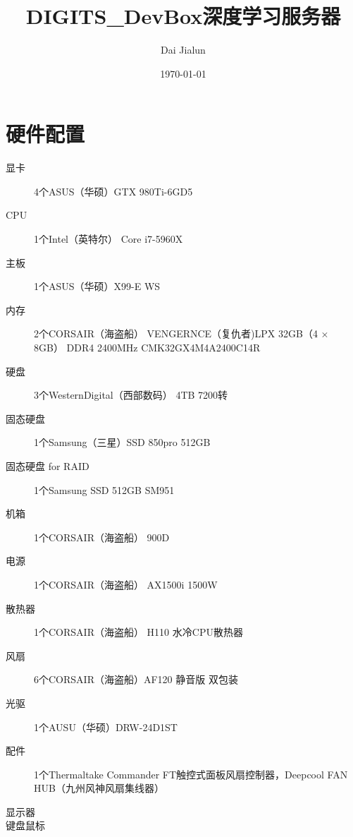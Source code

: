 

\title{\vspace{-2em} DIGITS\_DevBox深度学习服务器\\
\normalsize{}}
\author{Dai Jialun}
\date{\vspace{-0.7em} \today \vspace{-0.7em}}
\maketitle\thispagestyle{fancy}
\maketitle
\section{硬件配置}
\begin{description}
\item[显卡] 4个ASUS（华硕）GTX 980Ti-6GD5
\item[CPU] 1个Intel（英特尔） Core i7-5960X
\item[主板] 1个ASUS（华硕）X99-E WS
\item[内存] 2个CORSAIR（海盗船） VENGERNCE（复仇者)LPX 32GB（4 $\times$ 8GB） DDR4 2400MHz CMK32GX4M4A2400C14R
\item[硬盘] 3个WesternDigital（西部数码） 4TB 7200转
\item[固态硬盘] 1个Samsung（三星）SSD 850pro 512GB
\item[固态硬盘 for RAID] 1个Samsung SSD 512GB SM951
\item[机箱] 1个CORSAIR（海盗船） 900D
\item[电源] 1个CORSAIR（海盗船） AX1500i 1500W
\item[散热器] 1个CORSAIR（海盗船） H110 水冷CPU散热器
\item[风扇] 6个CORSAIR（海盗船）AF120 静音版 双包装
\item[光驱] 1个AUSU（华硕）DRW-24D1ST
\item[配件] 1个Thermaltake Commander FT触控式面板风扇控制器，Deepcool FAN HUB（九州风神风扇集线器）
\item[显示器]
\item[键盘鼠标]
\end{description}

